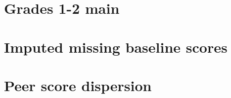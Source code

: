 \documentclass[11pt]{article}
\begin{document}
\begin{table}[H]
	\caption{Grades 3-4 with academy fixed effects}
	
\end{table}

\section*{Grades 1-2 main}

\begin{table}[H]
	\caption{Grades 1-2 with academy cohort fixed effects}
	
\end{table}

\begin{table}[H]
	\caption{Grades 1-2 with academy cohort and county fixed effects}
	
\end{table}

\begin{table}[H]
	\caption{Grades 1-2 with academy fixed effects}
	
\end{table}

\section*{Imputed missing baseline scores}

\begin{table}[H]
	\caption{Pooled with academy cohort fixed effects and imputed missing baseline scores}
	
\end{table}

\begin{table}[H]
	\caption{Grades 3-4 with academy cohort fixed effects and imputed missing baseline scores}
	
\end{table}

\begin{table}[H]
	\caption{Grades 1-2 with academy cohort fixed effects and imputed missing baseline scores}
	
\end{table}


\section{Peer score dispersion}

\begin{table}[H]
	\caption{Pooled with academy cohort fixed effects and peer scores dispersion}
	
\end{table}
\end{document}
